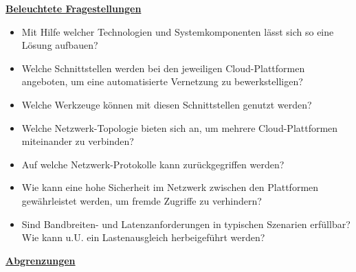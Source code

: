 \textbf{\underline{Beleuchtete Fragestellungen}}
\begin{itemize}
    \item Mit Hilfe welcher Technologien und Systemkomponenten lässt sich so eine Lösung aufbauen?
    \item Welche Schnittstellen werden bei den jeweiligen Cloud-Plattformen angeboten, um eine automatisierte Vernetzung zu bewerkstelligen?
    \item Welche Werkzeuge können mit diesen Schnittstellen genutzt werden?
    \item Welche Netzwerk-Topologie bieten sich an, um mehrere Cloud-Plattformen miteinander zu verbinden?
    \item Auf welche Netzwerk-Protokolle kann zurückgegriffen werden?
    \item Wie kann eine hohe Sicherheit im Netzwerk zwischen den Plattformen gewährleistet werden, um fremde Zugriffe zu verhindern?
    \item Sind Bandbreiten- und Latenzanforderungen in typischen Szenarien erfüllbar? Wie kann u.U. ein Lastenausgleich herbeigeführt werden?
\end{itemize}

\textbf{\underline{Abgrenzungen}}


